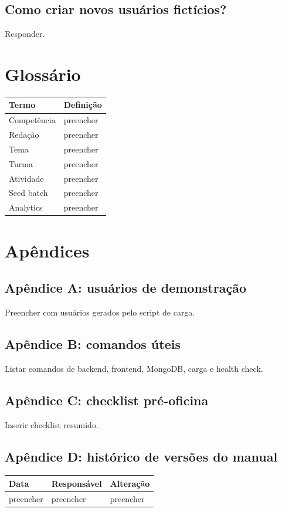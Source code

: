 \documentclass[12pt,a4paper]{article}
\begin{document}
\subsection{Como criar novos usuários fictícios?}
Responder.

\section{Glossário}

\begin{longtable}{|p{4cm}|p{10cm}|}
\hline
\textbf{Termo} & \textbf{Definição} \\
\hline
Competência & preencher \\
\hline
Redação & preencher \\
\hline
Tema & preencher \\
\hline
Turma & preencher \\
\hline
Atividade & preencher \\
\hline
Seed batch & preencher \\
\hline
Analytics & preencher \\
\hline
\end{longtable}

\section{Apêndices}

\subsection{Apêndice A: usuários de demonstração}
Preencher com usuários gerados pelo script de carga.

\subsection{Apêndice B: comandos úteis}
Listar comandos de backend, frontend, MongoDB, carga e health check.

\subsection{Apêndice C: checklist pré-oficina}
Inserir checklist resumido.

\subsection{Apêndice D: histórico de versões do manual}

\begin{longtable}{|p{3cm}|p{4cm}|p{7cm}|}
\hline
\textbf{Data} & \textbf{Responsável} & \textbf{Alteração} \\
\hline
preencher & preencher & preencher \\
\hline
\end{longtable}
\end{document}
